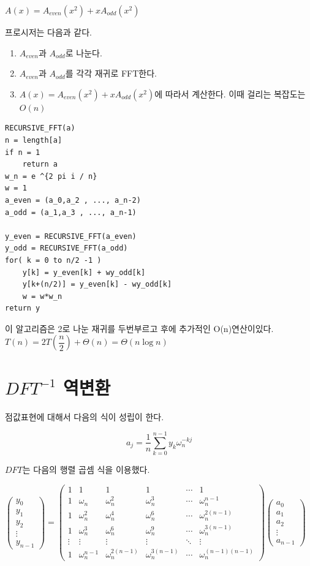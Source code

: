 \documentclass{oblivoir}
\begin{document}
$A(x) = A_{even}(x^2) + xA_{odd}(x^2) $

프로시저는 다음과 같다.
\begin{enumerate}
    \item $A_{even}$과 $A_{odd}$로 나눈다.
    \item $A_{even}$과 $A_{odd}$를 각각 재귀로 FFT한다.
    \item $A(x) = A_{even}(x^2) + xA_{odd}(x^2) $에 따라서 계산한다. 이때 걸리는 복잡도는 $O(n)$
\end{enumerate}


\begin{lstlisting}[style = CStyle]
RECURSIVE_FFT(a)
n = length[a]
if n = 1
    return a
w_n = e ^{2 pi i / n}
w = 1
a_even = (a_0,a_2 , ..., a_n-2)
a_odd = (a_1,a_3 , ..., a_n-1)

y_even = RECURSIVE_FFT(a_even)
y_odd = RECURSIVE_FFT(a_odd)
for( k = 0 to n/2 -1 )
    y[k] = y_even[k] + wy_odd[k]
    y[k+(n/2)] = y_even[k] - wy_odd[k]
    w = w*w_n
return y
\end{lstlisting}

이 알고리즘은 2로 나눈 재귀를 두번부르고 후에 추가적인 O(n)연산이있다.
$T(n) = 2T\left(\dfrac{n}{2}\right) + \Theta(n) = \Theta(n \log n)$

\section{$DFT^{-1}$ 역변환}

점값표현에 대해서 다음의 식이 성립이 한다.

$$ a_j = \dfrac{1}{n}\sum_{k=0}^{n-1} y_k\omega_{n}^{-kj}$$

$DFT$는 다음의 행렬 곱셈 식을 이용했다.

$
\begin{pmatrix}
    y_0 \\ 
    y_1 \\
    y_2 \\
    \vdots \\
    y_{n-1}
\end{pmatrix}
=
\begin{pmatrix}
    1 & 1 & 1 & 1 & \cdots & 1 \\
    1 & \omega_n & \omega_n^2 & \omega_n^3 & \cdots & \omega_n^{n-1} \\
    1 & \omega_n^2 & \omega_n^4 & \omega_n^6 & \cdots & \omega_n^{2(n-1)} \\
    1 & \omega_n^3 & \omega_n^6 & \omega_n^9 & \cdots & \omega_n^{3(n-1)} \\
    \vdots & \vdots & \vdots & \vdots & \ddots & \vdots \\
    1 & \omega_n^{n-1} & \omega_n^{2(n-1)} & \omega_n^{3(n-1)} & \cdots & \omega_n^{(n-1)(n-1)} 
\end{pmatrix}
\begin{pmatrix}
    a_0 \\ 
    a_1 \\
    a_2 \\
    \vdots \\
    a_{n-1}
\end{pmatrix}
$
\end{document}
